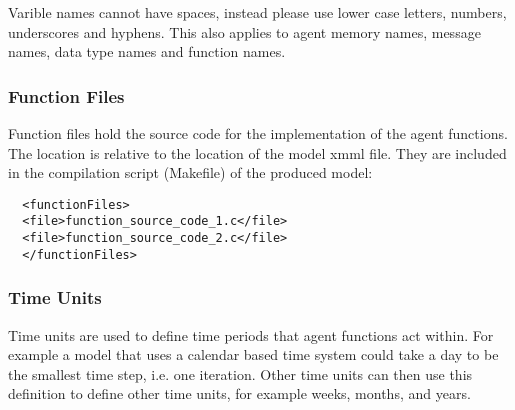 Varible names cannot have spaces, instead please use lower case letters,
numbers, underscores and hyphens. This also applies to agent memory names, message names, data type
names and function names.

% 
% 
% 

\subsubsection{Function Files}

Function files hold the source code for the implementation of the
agent functions. The location is relative to the location of the model
xmml file. They are included in the compilation script (Makefile) of the
produced model:

\begin{verbatim}
  <functionFiles>
  <file>function_source_code_1.c</file>
  <file>function_source_code_2.c</file>
  </functionFiles>
\end{verbatim}

\subsubsection{Time Units}
\label{timeunit}


Time units are used to define time periods that agent functions act within. For
example a model that uses a calendar based time system could take a day to be
the smallest time step, i.e. one iteration. Other time units can then use this
definition to define other time units, for example weeks, months, and years.

